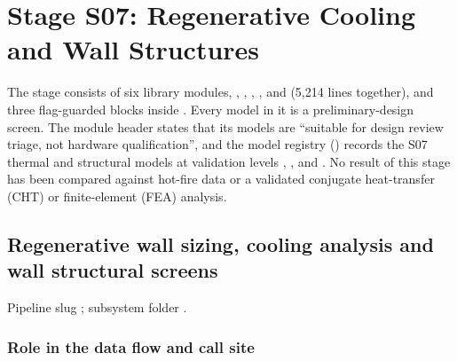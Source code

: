 \chapter{Stage S07: Regenerative Cooling and Wall Structures}\label{ch:s07}


The stage consists of six library modules, , , , ,  and  (5,214 lines together), and three flag-guarded blocks inside . Every model in it is a preliminary-design screen. The  module header states that its models are ``suitable for design review triage, not hardware qualification'', and the model registry () records the S07 thermal and structural models at validation levels , ,  and . No result of this stage has been compared against hot-fire data or a validated conjugate heat-transfer (CHT) or finite-element (FEA) analysis.

\section{Regenerative wall sizing, cooling analysis and wall structural screens}\label{sec:s07}

\quad Pipeline slug ; subsystem folder .

\subsection{Role in the data flow and call site}\label{sec:s07-role}

